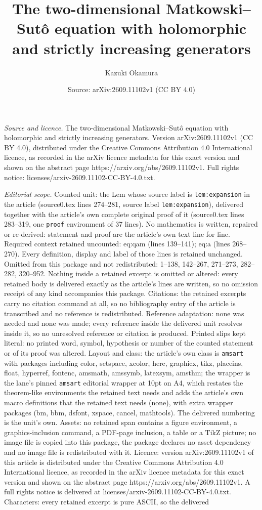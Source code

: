 \documentclass[10pt,a4paper]{amsart}
\title[The two-dimensional Matkowski--Sut\^o equation with holomorp]{The two-dimensional Matkowski--Sut\^o equation with holomorphic and strictly increasing generators}
\author{Kazuki Okamura}
\date{Source: arXiv:2609.11102v1 (CC BY 4.0)}
\begin{document}
\maketitle

\noindent\emph{Source and licence.} The two-dimensional Matkowski--Sut\^o equation with holomorphic and strictly increasing generators. Version arXiv:2609.11102v1 (CC BY 4.0), distributed under the Creative Commons Attribution 4.0 International licence, as recorded in the arXiv licence metadata for this exact version and shown on the abstract page https://arxiv.org/abs/2609.11102v1. Full rights notice: licenses/arxiv-2609.11102-CC-BY-4.0.txt.\par\smallskip

\noindent\textit{Editorial scope.} Counted unit: the Lem whose source label is \texttt{lem:expansion} in the article (source0.tex lines 274--281, source label \texttt{lem:expansion}), delivered together with the article's own complete original proof of it (source0.tex lines 283--319, one \texttt{proof} environment of 37 lines). No mathematics is written, repaired or re-derived: statement and proof are the article's own text line for line. Required context retained uncounted: eq:qam (lines 139--141); eq:a (lines 268--270). Every definition, display and label of those lines is retained unchanged. Omitted from this package and not redistributed: 1--138, 142--267, 271--273, 282--282, 320--952. Nothing inside a retained excerpt is omitted or altered: every retained body is delivered exactly as the article's lines are written, so no omission receipt of any kind accompanies this package. Citations: the retained excerpts carry no citation command at all, so no bibliography entry of the article is transcribed and no reference is redistributed. Reference adaptation: none was needed and none was made; every reference inside the delivered unit resolves inside it, so no unresolved reference or citation is produced. Printed slips kept literal: no printed word, symbol, hypothesis or number of the counted statement or of its proof was altered. Layout and class: the article's own class is \texttt{amsart} with packages including color, setspace, xcolor, here, graphicx, tikz, placeins, float, hyperref, fontenc, amsmath, amssymb, latexsym, amsthm; the wrapper is the lane's pinned \texttt{amsart} editorial wrapper at 10pt on A4, which restates the theorem-like environments the retained text needs and adds the article's own macro definitions that the retained text needs (none), with extra wrapper packages (bm, bbm, dsfont, xspace, cancel, mathtools). The delivered numbering is the unit's own. Assets: no retained span contains a figure environment, a graphics-inclusion command, a PDF-page inclusion, a table or a TikZ picture; no image file is copied into this package, the package declares no asset dependency and no image file is redistributed with it. Licence: version arXiv:2609.11102v1 of this article is distributed under the Creative Commons Attribution 4.0 International licence, as recorded in the arXiv licence metadata for this exact version and shown on the abstract page https://arxiv.org/abs/2609.11102v1. A full rights notice is delivered at licenses/arxiv-2609.11102-CC-BY-4.0.txt. Characters: every retained excerpt is pure ASCII, so the delivered 
\end{document}
